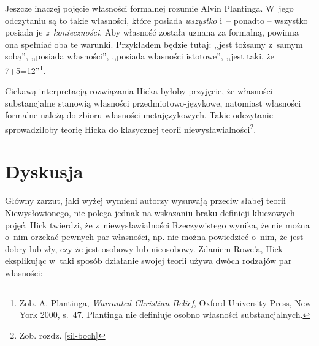 Jeszcze inaczej pojęcie własności formalnej rozumie Alvin Plantinga. W~jego odczytaniu są to takie własności, które posiada \textit{wszystko} i~-- ponadto -- wszystko posiada je \textit{z~konieczności}. Aby własność została uznana za formalną, powinna ona spełniać oba te warunki. Przykładem będzie tutaj: ,,jest tożsamy z~samym sobą'', ,,posiada własności'', ,,posiada własności istotowe'', ,,jest taki, że 7+5=12''\footnote{Zob. A. Plantinga, \textit{Warranted Christian Belief}, Oxford University Press, New York 2000, s.~47. Plantinga nie definiuje osobno własności substancjalnych.}.

Ciekawą interpretacją rozwiązania Hicka byłoby przyjęcie, że własności substancjalne stanowią własności przedmiotowo-językowe, natomiast własności formalne należą do zbioru własności metajęzykowych. Takie odczytanie sprowadziłoby teorię Hicka do klasycznej teorii niewysławialności\footnote{Zob. rozdz. \ref{sil-boch}}.


\section{Dyskusja}

Główny zarzut, jaki wyżej wymieni autorzy wysuwają przeciw słabej teorii Niewysłowionego, nie polega jednak na wskazaniu braku definicji kluczowych pojęć.
Hick twierdzi, że z~niewysławialności Rzeczywistego wynika, że nie można o~nim orzekać pewnych par własności, np. nie można powiedzieć o~nim, że jest dobry lub zły, czy że jest osobowy lub nieosobowy. Zdaniem Rowe'a, Hick eksplikując w~taki sposób działanie swojej teorii używa dwóch rodzajów par własności:

